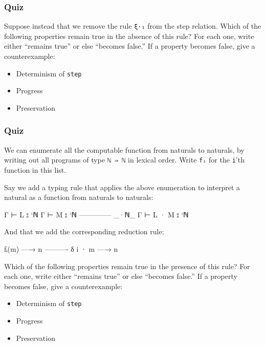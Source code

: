 \hypertarget{quiz-2}{%
\subsubsection{Quiz}\label{quiz-2}}

Suppose instead that we remove the rule \texttt{ξ·₁} from the step
relation. Which of the following properties remain true in the absence
of this rule? For each one, write either ``remains true'' or else
``becomes false.'' If a property becomes false, give a counterexample:

\begin{itemize}
\item
  Determinism of \texttt{step}
\item
  Progress
\item
  Preservation
\end{itemize}

\hypertarget{quiz-3}{%
\subsubsection{Quiz}\label{quiz-3}}

We can enumerate all the computable function from naturals to naturals,
by writing out all programs of type
\texttt{\textasciigrave{}ℕ\ ⇒\ \textasciigrave{}ℕ} in lexical order.
Write \texttt{fᵢ} for the \texttt{i}'th function in this list.

Say we add a typing rule that applies the above enumeration to interpret
a natural as a function from naturals to naturals:

\begin{myDisplay}
Γ ⊢ L ⦂ `ℕ
Γ ⊢ M ⦂ `ℕ
-------------- _·ℕ_
Γ ⊢ L · M ⦂ `ℕ
\end{myDisplay}

And that we add the corresponding reduction rule:

\begin{myDisplay}
fᵢ(m) —→ n
---------- δ
i · m —→ n
\end{myDisplay}

Which of the following properties remain true in the presence of this
rule? For each one, write either ``remains true'' or else ``becomes
false.'' If a property becomes false, give a counterexample:

\begin{itemize}
\item
  Determinism of \texttt{step}
\item
  Progress
\item
  Preservation
\end{itemize}


